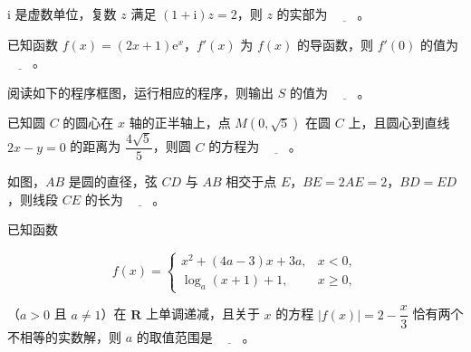 \begin{question}
\(\mathrm{i}\) 是虚数单位，复数 \(z\) 满足 \((1+\mathrm{i})z=2\)，则 \(z\) 的实部为 \(\underline{\qquad}\)。

\end{question}
\begin{question}
已知函数 \(f(x)=(2x+1)\mathrm{e}^{x}\)，\(f'(x)\) 为 \(f(x)\) 的导函数，则 \(f'(0)\) 的值为 \(\underline{\qquad}\)。

\Needspace{0.4\textheight}
\end{question}
\begin{question}
阅读如下的程序框图，运行相应的程序，则输出 \(S\) 的值为 \(\underline{\qquad}\)。
\nopagebreak[4]
\begin{center}\end{center}
\nopagebreak[4]
\end{question}
\begin{question}
已知圆 \(C\) 的圆心在 \(x\) 轴的正半轴上，点 \(M(0,\sqrt{5})\) 在圆 \(C\) 上，且圆心到直线 \(2x-y=0\) 的距离为 \(\dfrac{4\sqrt{5}}{5}\)，则圆 \(C\) 的方程为 \(\underline{\qquad}\)。

\Needspace{0.4\textheight}
\end{question}
\begin{question}
如图，\(AB\) 是圆的直径，弦 \(CD\) 与 \(AB\) 相交于点 \(E\)，\(BE=2AE=2\)，\(BD=ED\)，则线段 \(CE\) 的长为 \(\underline{\qquad}\)。
\nopagebreak[4]
\begin{center}\end{center}
\nopagebreak[4]
\end{question}
\begin{question}
已知函数

\nopagebreak[4]
\[
f(x)=\begin{cases}
x^{2}+(4a-3)x+3a, & x<0,\\
\log_{a}(x+1)+1, & x\geqslant 0,
\end{cases}
\]

（\(a>0\) 且 \(a\neq 1\)）在 \(\mathbf{R}\) 上单调递减，且关于 \(x\) 的方程 \(|f(x)|=2-\dfrac{x}{3}\) 恰有两个不相等的实数解，则 \(a\) 的取值范围是 \(\underline{\qquad}\)。

\end{question}

